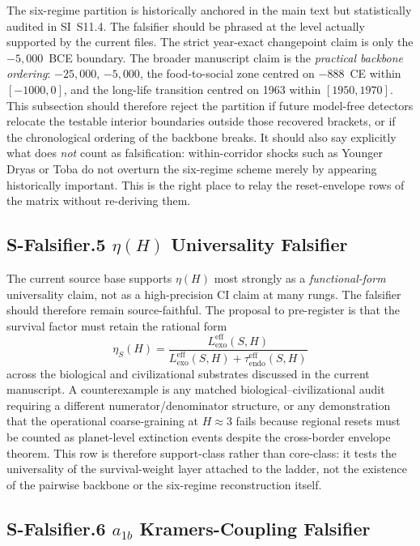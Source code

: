 \documentclass[11pt]{article}
\begin{document}
The six-regime partition is historically anchored in the main text but
statistically audited in SI~S11.4. The falsifier should be phrased at the
level actually supported by the current files. The strict year-exact
changepoint claim is only the $-5{,}000$~BCE boundary. The broader
manuscript claim is the \emph{practical backbone ordering}:
$-25{,}000$, $-5{,}000$, the food-to-social zone centred on $-888$~CE within
$[-1000,0]$, and the long-life transition centred on 1963 within
$[1950,1970]$. This subsection should therefore reject the partition if
future model-free detectors relocate the testable interior boundaries
outside those recovered brackets, or if the chronological ordering of the
backbone breaks. It should also say explicitly what does \emph{not} count as
falsification: within-corridor shocks such as Younger Dryas or Toba do not
overturn the six-regime scheme merely by appearing historically important.
This is the right place to relay the reset-envelope rows of the matrix
without re-deriving them.

\subsection*{S-Falsifier.5 \texorpdfstring{$\eta(H)$}{eta(H)} Universality Falsifier}
\label{sec:S-Falsifier-eta}

The current source base supports $\eta(H)$ most strongly as a
\emph{functional-form} universality claim, not as a high-precision CI claim
at many rungs. The falsifier should therefore remain source-faithful. The
proposal to pre-register is that the survival factor must retain the
rational form
\[\eta_S(H)=\frac{L_{\mathrm{exo}}^{\mathrm{eff}}(S,H)}
                 {L_{\mathrm{exo}}^{\mathrm{eff}}(S,H)+\tau_{\mathrm{endo}}^{\mathrm{eff}}(S,H)}\]
across the biological and civilizational substrates discussed in the current
manuscript. A counterexample is any matched biological--civilizational audit
requiring a different numerator/denominator structure, or any demonstration
that the operational coarse-graining at $H\approx 3$ fails because regional
resets must be counted as planet-level extinction events despite the
cross-border envelope theorem. This row is therefore support-class rather
than core-class: it tests the universality of the survival-weight layer
attached to the ladder, not the existence of the pairwise backbone or the
six-regime reconstruction itself.

\subsection*{S-Falsifier.6 \texorpdfstring{$a_{1b}$}{a1b} Kramers-Coupling Falsifier}
\label{sec:S-Falsifier-a1b}
\end{document}
